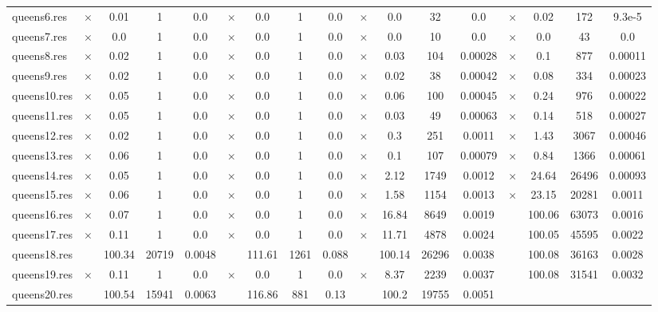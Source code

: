 \documentclass[main.tex]{subfiles}
\begin{document}
\begin{landscape}
\begin{center}
\begin{tabular}{|l|cccc|cccc|cccc|cccc|}
queens6.res & $\times$ & 0.01 & 1 & 0.0
 & $\times$ & 0.0 & 1 & 0.0
 & $\times$ & 0.0 & 32 & 0.0
 & $\times$ & 0.02 & 172 & 9.3e-5
\\
queens7.res & $\times$ & 0.0 & 1 & 0.0
 & $\times$ & 0.0 & 1 & 0.0
 & $\times$ & 0.0 & 10 & 0.0
 & $\times$ & 0.0 & 43 & 0.0
\\
queens8.res & $\times$ & 0.02 & 1 & 0.0
 & $\times$ & 0.0 & 1 & 0.0
 & $\times$ & 0.03 & 104 & 0.00028
 & $\times$ & 0.1 & 877 & 0.00011
\\
queens9.res & $\times$ & 0.02 & 1 & 0.0
 & $\times$ & 0.0 & 1 & 0.0
 & $\times$ & 0.02 & 38 & 0.00042
 & $\times$ & 0.08 & 334 & 0.00023
\\
queens10.res & $\times$ & 0.05 & 1 & 0.0
 & $\times$ & 0.0 & 1 & 0.0
 & $\times$ & 0.06 & 100 & 0.00045
 & $\times$ & 0.24 & 976 & 0.00022
\\
queens11.res & $\times$ & 0.05 & 1 & 0.0
 & $\times$ & 0.0 & 1 & 0.0
 & $\times$ & 0.03 & 49 & 0.00063
 & $\times$ & 0.14 & 518 & 0.00027
\\
queens12.res & $\times$ & 0.02 & 1 & 0.0
 & $\times$ & 0.0 & 1 & 0.0
 & $\times$ & 0.3 & 251 & 0.0011
 & $\times$ & 1.43 & 3067 & 0.00046
\\
queens13.res & $\times$ & 0.06 & 1 & 0.0
 & $\times$ & 0.0 & 1 & 0.0
 & $\times$ & 0.1 & 107 & 0.00079
 & $\times$ & 0.84 & 1366 & 0.00061
\\
queens14.res & $\times$ & 0.05 & 1 & 0.0
 & $\times$ & 0.0 & 1 & 0.0
 & $\times$ & 2.12 & 1749 & 0.0012
 & $\times$ & 24.64 & 26496 & 0.00093
\\
queens15.res & $\times$ & 0.06 & 1 & 0.0
 & $\times$ & 0.0 & 1 & 0.0
 & $\times$ & 1.58 & 1154 & 0.0013
 & $\times$ & 23.15 & 20281 & 0.0011
\\
queens16.res & $\times$ & 0.07 & 1 & 0.0
 & $\times$ & 0.0 & 1 & 0.0
 & $\times$ & 16.84 & 8649 & 0.0019
 &  & 100.06 & 63073 & 0.0016
\\
queens17.res & $\times$ & 0.11 & 1 & 0.0
 & $\times$ & 0.0 & 1 & 0.0
 & $\times$ & 11.71 & 4878 & 0.0024
 &  & 100.05 & 45595 & 0.0022
\\
queens18.res &  & 100.34 & 20719 & 0.0048
 &  & 111.61 & 1261 & 0.088
 &  & 100.14 & 26296 & 0.0038
 &  & 100.08 & 36163 & 0.0028
\\
queens19.res & $\times$ & 0.11 & 1 & 0.0
 & $\times$ & 0.0 & 1 & 0.0
 & $\times$ & 8.37 & 2239 & 0.0037
 &  & 100.08 & 31541 & 0.0032
\\
queens20.res &  & 100.54 & 15941 & 0.0063
 &  & 116.86 & 881 & 0.13
 &  & 100.2 & 19755 & 0.0051

\end{tabular}
\end{center}
\end{landscape}
\end{document}
